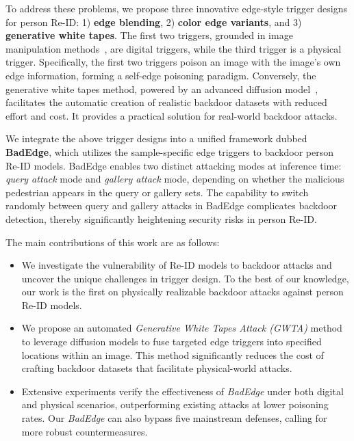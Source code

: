 \documentclass[sigconf,authordraft]{acmart}
\begin{document}
To address these problems, we propose three innovative edge-style trigger designs for person Re-ID: 1) \textbf{edge blending}, 2) \textbf{color edge variants}, and 3) \textbf{generative white tapes}. The first two triggers, grounded in image manipulation methods~\cite{canny1986computational,duda1973pattern,e2008digital}, are digital triggers, while the third trigger is a physical trigger. Specifically, the first two triggers poison an image with the image's own edge information, forming a self-edge poisoning paradigm. Conversely, the generative white tapes method, powered by an advanced diffusion model~\cite{hu2021lora}, facilitates the automatic creation of realistic backdoor datasets with reduced effort and cost. It provides a practical solution for real-world backdoor attacks.

We integrate the above trigger designs into a unified framework dubbed \textbf{BadEdge}, which utilizes the sample-specific edge triggers to backdoor person Re-ID models. 
BadEdge enables two distinct attacking modes at inference time: \emph{query attack} mode and \emph{gallery attack} mode, depending on whether the malicious pedestrian appears in the query or gallery sets. The capability to switch randomly between query and gallery attacks in BadEdge complicates backdoor detection, thereby significantly heightening security risks in person Re-ID.

The main contributions of this work are as follows:
\begin{itemize}
\item We investigate the vulnerability of Re-ID models to backdoor attacks and uncover the unique challenges in trigger design. To the best of our knowledge, our work is the first on physically realizable backdoor attacks against person Re-ID models.

\item We propose an automated \emph{Generative White Tapes Attack (GWTA)} method to leverage diffusion models to fuse targeted edge triggers into specified locations within an image. This method significantly reduces the cost of crafting backdoor datasets that facilitate physical-world attacks.

\item Extensive experiments verify the effectiveness of \emph{BadEdge} under both digital and physical scenarios, outperforming existing attacks at lower poisoning rates. Our \emph{BadEdge} can also bypass five mainstream defenses, calling for more robust countermeasures.
\end{itemize}
\end{document}
